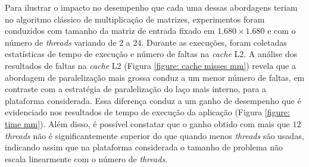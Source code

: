 \documentclass{SBCbookchapter}
\begin{document}
		Para ilustrar o impacto no desempenho que cada uma dessas
		abordagens teriam no algoritmo clássico de multiplicação de
		matrizes, experimentos foram conduzidos com tamanho da matriz de
		entrada fixado em $1.680 \times 1.680$ e com o número de
		\textit{threads} variando de $2$ a $24$. Durante as execuções,
		foram coletadas estatísticas de tempo de execução e número de
		faltas na \textit{cache} L2.  A análise dos resultados de faltas
		na \textit{cache} L2 (Figura \ref{figure: cache misses mm})
		revela que a abordagem de paralelização mais grossa conduz a um
		menor número de faltas, em contraste com a estratégia de
		paralelização do laço mais interno, para a plataforma
		considerada. Essa diferença conduz a um ganho de desempenho que
		é evidenciado nos resultados de tempo de execução da aplicação
		(Figura \ref{figure: time mm}). Além disso, é possível constatar
		que o ganho obtido com mais que $12$ \textit{threads} não é
		significantemente superior do que quando menos \textit{threads}
		são usadas, indicando assim que na plataforma considerada o
		tamanho de problema não escala linearmente com o número de
		\textit{threads}.
\end{document}

